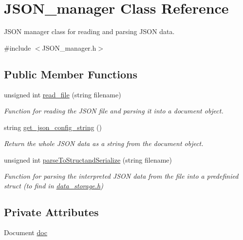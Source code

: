 \hypertarget{classJSON__manager}{}\section{J\+S\+O\+N\+\_\+manager Class Reference}
\label{classJSON__manager}


J\+S\+ON manager class for reading and parsing J\+S\+ON data.  




{\ttfamily \#include $<$J\+S\+O\+N\+\_\+manager.\+h$>$}

\subsection*{Public Member Functions}
\begin{DoxyCompactItemize}
\item 
unsigned int \hyperlink{classJSON__manager_a9b600a34d73fd3f28bf00ddf3f2e6640}{read\+\_\+file} (string filename)
\begin{DoxyCompactList}\small\item\em Function for reading the J\+S\+ON file and parsing it into a document object. \end{DoxyCompactList}\item 
string \hyperlink{classJSON__manager_a5d05e5f8eb6883f38181d48cf26cc5fc}{get\+\_\+json\+\_\+config\+\_\+string} ()
\begin{DoxyCompactList}\small\item\em Return the whole J\+S\+ON data as a string from the document object. \end{DoxyCompactList}\item 
unsigned int \hyperlink{classJSON__manager_a7bb6db218d195494ca939233671cb183}{parse\+To\+Structand\+Serialize} (string filename)
\begin{DoxyCompactList}\small\item\em Function for parsing the interpreted J\+S\+ON data from the file into a predefinied struct (to find in \hyperlink{data__storage_8h}{data\+\_\+storage.\+h}) \end{DoxyCompactList}\end{DoxyCompactItemize}
\subsection*{Private Attributes}
\begin{DoxyCompactItemize}
\item 
Document \hyperlink{classJSON__manager_afa1c5569b74bd68fe785d553c798c4dd}{doc}
\end{DoxyCompactItemize}


